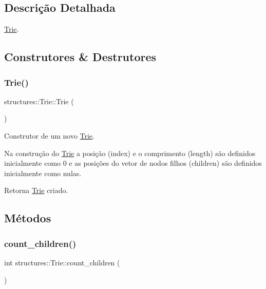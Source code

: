 \subsection{Descrição Detalhada}
\hyperlink{classstructures_1_1Trie}{Trie}. 

\subsection{Construtores \& Destrutores}
\mbox{\label{classstructures_1_1Trie_af6cf71564b040dfc62bbdedbbab8271a}} 
\subsubsection{\texorpdfstring{Trie()}{Trie()}}
{\footnotesize\ttfamily structures\+::\+Trie\+::\+Trie (\begin{DoxyParamCaption}{ }\end{DoxyParamCaption})}



Construtor de um novo \hyperlink{classstructures_1_1Trie}{Trie}. 

Na construção do \hyperlink{classstructures_1_1Trie}{Trie} a posição (index) e o comprimento (length) são definidos inicialmente como 0 e as posições do vetor de nodos filhos (children) são definidos inicialmente como nulas.

\begin{DoxyReturn}{Retorna}
\hyperlink{classstructures_1_1Trie}{Trie} criado. 
\end{DoxyReturn}


\subsection{Métodos}
\mbox{\label{classstructures_1_1Trie_af4cd9c96d1bcc79ab4aa1f107d6dbffd}} 
\subsubsection{\texorpdfstring{count\+\_\+children()}{count\_children()}}
{\footnotesize\ttfamily int structures\+::\+Trie\+::count\+\_\+children (\begin{DoxyParamCaption}{ }\end{DoxyParamCaption})}



